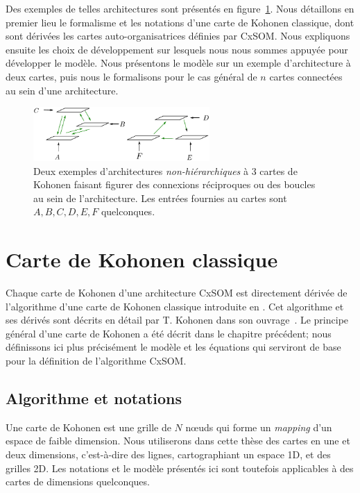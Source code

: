 \documentclass[../main]{subfiles}
\begin{document}
Des exemples de telles architectures sont présentés en figure~\ref{fig:archi_non_hierarchique}.
Nous détaillons en premier lieu le formalisme et les notations d'une carte de Kohonen classique, dont sont dérivées les cartes auto-organisatrices définies par CxSOM. 
Nous expliquons ensuite les choix de développement sur lesquels nous nous sommes appuyée pour développer le modèle. Nous présentons le modèle sur un exemple d'architecture à deux cartes, puis nous le formalisons pour le cas général de $n$ cartes connectées au sein d'une architecture.

\begin{figure}
\centering
\includegraphics[width=0.6\textwidth]{architecture.pdf}
\caption{Deux exemples d'architectures \emph{non-hiérarchiques} à 3 cartes de Kohonen faisant figurer des connexions réciproques ou des boucles au sein de l'architecture.
Les entrées fournies au cartes sont $A,B,C,D,E,F$ quelconques.}
\label{fig:archi_non_hierarchique}
\end{figure}


\section{Carte de Kohonen classique}\label{sec:kohonen}

Chaque carte de Kohonen d'une architecture CxSOM est directement dérivée de l'algorithme d'une carte de Kohonen classique introduite en \cite{Kohonen1982}. Cet algorithme et ses dérivés sont décrits en détail par T. Kohonen dans son ouvrage~\parencite{Kohonen1995SelfOrganizingM}. Le principe général d'une carte de Kohonen a été décrit dans le chapitre précédent; nous définissons ici plus précisément le modèle et les équations qui serviront de base pour la définition de l'algorithme CxSOM.

\subsection{Algorithme et notations}

Une carte de Kohonen est une grille de $N$ n\oe{}uds qui forme un \emph{mapping} d'un espace de faible dimension. 
Nous utiliserons dans cette thèse des cartes en une et deux dimensions, c'est-à-dire des lignes, cartographiant un espace 1D, et des grilles 2D. Les notations et le modèle présentés ici sont toutefois applicables à des cartes de dimensions quelconques.
\end{document}
